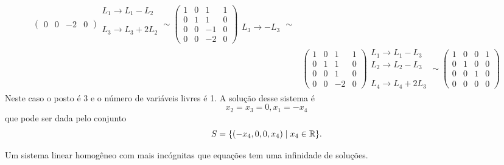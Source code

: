 \begin{exemplo}
\begin{solucao}
\begin{enumerate}
\begin{align*}
\begin{pmatrix}
                    0 & 0 & -2 & 0
                \end{pmatrix}
                \begin{array}{l}
                    L_1 \to L_1 - L_2\\\phantom{x}\\L_3 \to L_3 + 2L_2\\\phantom{x}
                \end{array}\sim
                \begin{pmatrix}
                    1 & 0 & 1 & 1\\
                    0 & 1 & 1 & 0\\
                    0 & 0 & -1 & 0\\
                    0 & 0 & -2 & 0
                \end{pmatrix}
                \begin{array}{l}
                    \phantom{x}\\\phantom{x}\\L_3 \to -L_3\\\phantom{x}
                \end{array}\sim\\
                &\begin{pmatrix}
                    1 & 0 & 1 & 1\\
                    0 & 1 & 1 & 0\\
                    0 & 0 & 1 & 0\\
                    0 & 0 & -2 & 0
                \end{pmatrix}
                \begin{array}{l}
                    L_1 \to L_1 - L_3\\L_2 \to L_2 - L_3\\\phantom{x}\\L_4 \to L_4 + 2L_3
                \end{array}\sim
                \begin{pmatrix}
                    1 & 0 & 0 & 1\\
                    0 & 1 & 0 & 0\\
                    0 & 0 & 1 & 0\\
                    0 & 0 & 0 & 0
                \end{pmatrix}
            \end{align*}
            Neste caso o posto é 3 e o número de variáveis livres é 1. A solução desse sistema é
            \[
                x_2 = x_3 = 0, x_1 = -x_4
            \]
            que pode ser dada pelo conjunto
            \[
                S = \{(-x_4, 0, 0, x_4) \mid x_4 \in \mathbb{R}\}.
            \]

    \end{enumerate}
\end{solucao}
\end{exemplo}
\begin{teorema}
    Um sistema linear homogêneo com mais incógnitas que equações tem uma infinidade de soluções.
\end{teorema}

